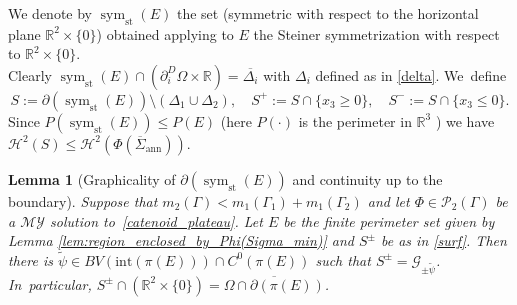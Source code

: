 \documentclass[11pt]{article}
\numberwithin{equation}{section}
\DeclareMathOperator{\sym}{sym}
\newcommand{\R}{\mathbb{R}}
\let\Om\Omega
\newcommand{\immclosedann}{\Phi({\overline\Sigma}_\mathrm{ann})}
\newtheorem{lemma}[theorem]{Lemma}
\theoremstyle{definition}
\begin{document}
We denote by $\sym_\mathrm{st}(E)$ the set (symmetric with respect to the horizontal plane $\R^2\times\{0\}$) obtained applying to $E$ the Steiner symmetrization with respect to $\R^2\times\{0\}$. \\
Clearly $\sym_\mathrm{st}(E)\cap(\partial_i^D\Om\times\R)=\overline{\Delta_i}$ with $\Delta_i$ defined as in \eqref{delta}. We~define
\begin{equation}\label{surf}
S:= \partial(\sym_\mathrm{st} (E))\setminus(\Delta_1\cup\Delta_2),\quad
S^+:= S\cap\{x_3\ge0\},\quad S^-:= S\cap\{x_3\le0\}.
\end{equation}
Since $P(\sym_\mathrm{st}(E))\le P(E)$ (here $P(\cdot)$ is the perimeter in $\R^3$ \cite{AFP}) we have $\mathcal{H}^2(S)\le\mathcal{H}^2(
\immclosedann)$.

\begin{lemma}[Graphicality
of $\partial(\sym_\mathrm{st} (E))$ and continuity up to the boundary]
\label{lem:graphicality_of_boundary_and_continuity_up_to_the_boundary}
Suppose that $m_2(\Gamma)<m_1(\Gamma_1)+m_1(\Gamma_2)$ and let $\Phi\in\mathcal{P}_2(\Gamma)$ be a $\mathcal{MY}$ solution to~\eqref{catenoid_plateau}.
Let $E$ be the finite perimeter set given by Lemma \ref{lem:region_enclosed_by_Phi(Sigma_min)} and $S^\pm$ be as in \eqref{surf}.
Then there is $\widetilde \psi\in BV(\mathrm{int}(\pi(E)))\cap C^0(\pi(E))$ such that
$
S^\pm=
\mathcal {G}_{\pm\widetilde\psi}$.
In~particular, $S^\pm\cap(\R^2\times\{0\})=\overline{\Om\cap\partial(\pi(E))}$.
\end{lemma}
\end{document}
